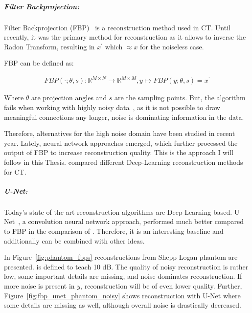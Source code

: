 \subparagraph{Filter Backprojection:}
Filter Backprojection (FBP)~\cite{tomographicReconstruction} is a reconstruction method used in CT.
Until recently, it was the primary method for reconstruction as it allows to inverse the Radon Transform, resulting in 
$x^{\prime}$ which $ \approx x$ for the noiseless case. 

FBP can be defined as:

\begin{equation}
    \label{eq:fbp}
    \begin{aligned}
        \textit{FBP}(\cdot; \theta, s) : \mathbb{R}^{M \times N} \to\mathbb{R}^{M \times M}, y \mapsto \textit{FBP}(y; \theta, s) = x^{\prime}
    \end{aligned}
\end{equation}

Where $\theta$ are projection angles and $s$ are the sampling points.
But, the algorithm fails when working with highly noisy data~\cite{cryoEmMath2}, as it is not possible to draw meaningful
connections any longer, noise
is dominating information in the data.

Therefore, alternatives for the high noise domain have been studied in recent year.
Lately, neural network approaches emerged, which further processed the output of FBP to increase reconstruction quality.
This is the approach I will follow in this Thesis. \citet{ct-reconstruction-comparison} compared different 
Deep-Learning reconstruction methods for CT. 

\subparagraph{U-Net:}
Today's state-of-the-art reconstruction algorithms are Deep-Learning based.
U-Net~\cite{unet-tomography}, a convolution neural network approach, performed
much better compared to FBP in the comparison of \citet{ct-reconstruction-comparison}.
Therefore, it is an interesting baseline and additionally can be combined with other ideas.

In Figure~\ref{fig:phantom_fbps} reconstructions from Shepp-Logan phantom are presented.
\snry is defined to teach 10 dB.
The quality of noisy reconstruction is rather low, some important details are missing, and noise dominates reconstruction.
If more noise is present in $y$, reconstruction will be of even lower quality.
Further, Figure~\ref{fig:fbp_unet_phantom_noisy} 
shows reconstruction with U-Net where some details are missing as well, although overall noise is drastically decreased.


